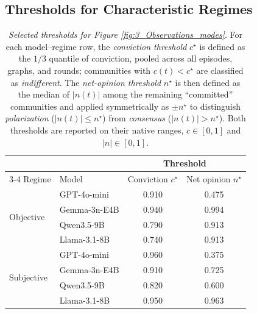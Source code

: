 
\clearpage
\subsection{Thresholds for Characteristic Regimes}\label{apdx:mode_thresholds}

\begin{table}[h!]
\centering
\begin{tabular}{llcc}
\toprule
 & & \multicolumn{2}{c}{Threshold} \\
\cmidrule(lr){3-4}
Regime & Model & Conviction $c^\star$ & Net opinion $n^\star$ \\
\midrule
\multirow{4}{*}{Objective}
              & GPT-4o-mini   & 0.910 & 0.475 \\
              & Gemma-3n-E4B  & 0.940 & 0.994 \\
              & Qwen3.5-9B    & 0.790 & 0.913 \\
              & Llama-3.1-8B    & 0.740 & 0.913 \\
\midrule
\multirow{4}{*}{Subjective}
              & GPT-4o-mini   & 0.960 & 0.375 \\
              & Gemma-3n-E4B  & 0.910 & 0.725 \\
              & Qwen3.5-9B    & 0.820 & 0.600 \\
              & Llama-3.1-8B    & 0.950 & 0.963 \\
\bottomrule
\end{tabular}
\caption{\textit{Selected thresholds for Figure \ref{fig:3_Observations_modes}}. For each model--regime row, the
\emph{conviction threshold} $c^\star$ is defined as the $1/3$ quantile of conviction,
pooled across all episodes, graphs, and rounds; communities with $c(t)<c^\star$ are
classified as \emph{indifferent}. The \emph{net-opinion threshold} $n^\star$ is then
defined as the median of $|n(t)|$ among the remaining ``committed'' communities and
applied symmetrically as $\pm n^\star$ to distinguish \emph{polarization}
($|n(t)|\le n^\star$) from \emph{consensus} ($|n(t)|>n^\star$). Both thresholds are
reported on their native ranges, $c\in[0,1]$ and $|n|\in[0,1]$.}
\label{tab:mode_thresholds}
\end{table}
